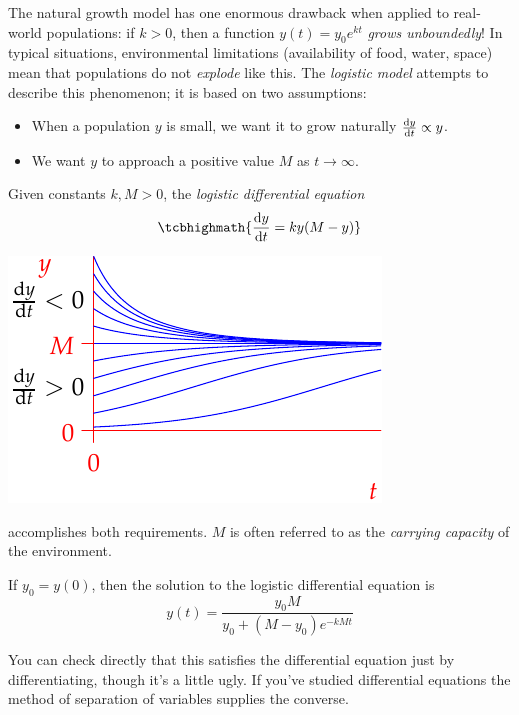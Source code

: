 The natural growth model has one enormous drawback when applied to real-world populations: if $k>0$, then a function $y(t)=y_0e^{kt}$ \emph{grows unboundedly}! In typical situations, environmental limitations (availability of food, water, space) mean that populations do not \emph{explode} like this. The \emph{logistic model} attempts to describe this phenomenon; it is based on two assumptions:\par
\begin{minipage}[t]{0.6\linewidth}\vspace{-5pt}
	\begin{itemize}
	  \item When a population $y$ is small, we want it to grow naturally $\diff[y]{t}\propto y$.
		\item We want $y$ to approach a positive value $M$ as $t\to \infty$.
	\end{itemize}
	Given constants $k,M>0$, the \emph{logistic differential equation}
	\[
		\tcbhighmath{\diff[y]{t}=ky(M-y)}
	\]
\end{minipage}
\hfill
\begin{minipage}[t]{0.39\linewidth}\vspace{0pt}
	\flushright\includegraphics{logisticsf}
\end{minipage}\medbreak
accomplishes both requirements. $M$ is often referred to as the \emph{carrying capacity} of the environment.



\begin{thm}{}{}
	If $y_0=y(0)$, then the solution to the logistic differential equation is
	\[
		y(t)=\frac{y_0M}{y_0+(M-y_0)e^{-kMt}}
	\]
\end{thm}

You can check directly that this satisfies the differential equation just by differentiating, though it's a little ugly. If you've studied differential equations the method of separation of variables supplies the converse.

